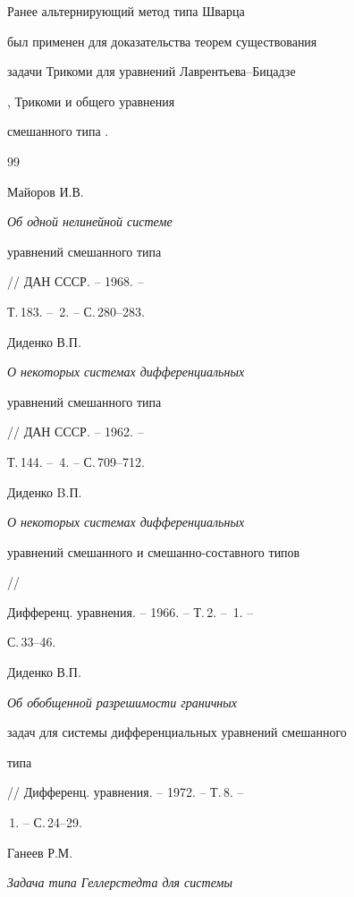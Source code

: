 \begin{note}


Ранее альтернирующий метод типа Шварца


был применен для доказательства теорем существования


задачи Трикоми для уравнений Лаврентьева--Бицадзе


\cite{Bitz}, Трикоми \cite{Bab} и общего уравнения


смешанного типа \cite{Sa_shw}.


\end{note}





\begin{thebibliography}{99}





 Майоров И.В. {\it Об одной нелинейной системе


уравнений смешанного типа} // ДАН СССР. -- 1968. --


Т.\,183. -- \No\,2. -- С.\,280--283.





 Диденко В.П. {\it О некоторых системах дифференциальных


уравнений смешанного типа} // ДАН СССР. -- 1962. --


Т.\,144. -- \No\,4. -- С.\,709--712.





 Диденко B.П. {\it О некоторых системах дифференциальных


уравнений смешанного и смешанно-составного типов} //


Дифференц. уравнения. -- 1966. -- Т.\,2. -- \No\,1. --


С.\,33--46.





 Диденко В.П. {\it Об обобщенной разрешимости граничных


задач для системы дифференциальных уравнений смешанного


типа} // Дифференц. уравнения. -- 1972. -- Т.\,8. --


\No\,1. -- С.\,24--29.





 Ганеев Р.М. {\it Задача типа Геллерстедта для системы


}
\end{thebibliography}

